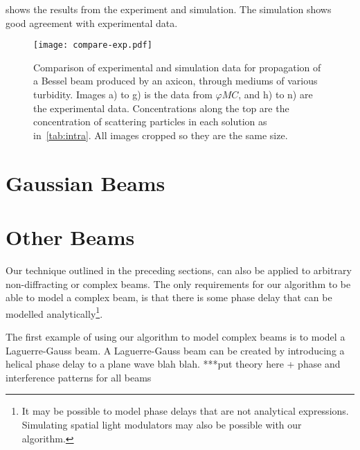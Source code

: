  shows the results from the experiment and simulation. The simulation shows good agreement with experimental data.

\begin{figure}[!ht]
\centering
\texttt{[image: compare-exp.pdf]}
\caption{Comparison of experimental and simulation data for propagation of a Bessel beam produced by an axicon, through mediums of various turbidity. Images a) to g) is the data from $\varphi MC$, and h) to n) are the experimental data. Concentrations along the top are the concentration of scattering particles in each solution as in~\cref{tab:intra}. All images cropped so they are the same size.}
\label{fig:compareexpbessel}
\end{figure}



\FloatBarrier

\section{Gaussian Beams}

% 

\section{Other Beams}

Our technique outlined in the preceding sections, can also be applied to arbitrary non-diffracting or complex beams. The only requirements for our algorithm to be able to model a complex beam, is that there is some phase delay that can be modelled analytically\footnote{It may be possible to model phase delays that are not analytical expressions. Simulating spatial light modulators may also be possible with our algorithm.}.

The first example of using our algorithm to model complex beams is to model a Laguerre-Gauss beam. A Laguerre-Gauss beam can be created by introducing a helical phase delay to a plane wave blah blah. ***put theory here + phase and interference patterns for all beams

